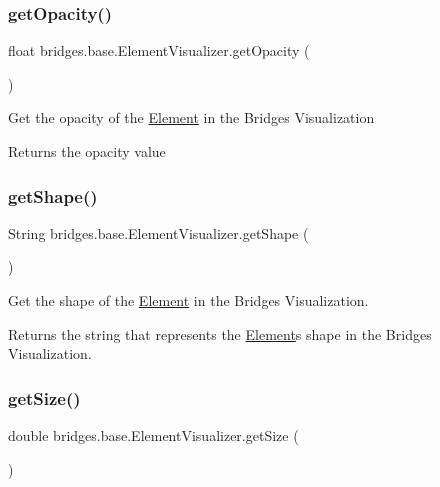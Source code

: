 \subsubsection{\texorpdfstring{get\+Opacity()}{getOpacity()}}
{\footnotesize\ttfamily float bridges.\+base.\+Element\+Visualizer.\+get\+Opacity (\begin{DoxyParamCaption}{ }\end{DoxyParamCaption})}

Get the opacity of the \mbox{\hyperlink{classbridges_1_1base_1_1_element}{Element}} in the Bridges Visualization \begin{DoxyReturn}{Returns}
the opacity value 
\end{DoxyReturn}
\mbox{\label{classbridges_1_1base_1_1_element_visualizer_a8ef0825745e49f32b57e4bf6c891b57e}} 
\subsubsection{\texorpdfstring{get\+Shape()}{getShape()}}
{\footnotesize\ttfamily String bridges.\+base.\+Element\+Visualizer.\+get\+Shape (\begin{DoxyParamCaption}{ }\end{DoxyParamCaption})}

Get the shape of the \mbox{\hyperlink{classbridges_1_1base_1_1_element}{Element}} in the Bridges Visualization.

\begin{DoxyReturn}{Returns}
the string that represents the \mbox{\hyperlink{classbridges_1_1base_1_1_element}{Element}}\textquotesingle{}s shape in the Bridges Visualization. 
\end{DoxyReturn}
\mbox{\label{classbridges_1_1base_1_1_element_visualizer_a0b7673bf724e3df1f94df50ad95ca5b1}} 
\subsubsection{\texorpdfstring{get\+Size()}{getSize()}}
{\footnotesize\ttfamily double bridges.\+base.\+Element\+Visualizer.\+get\+Size (\begin{DoxyParamCaption}{ }\end{DoxyParamCaption})}

